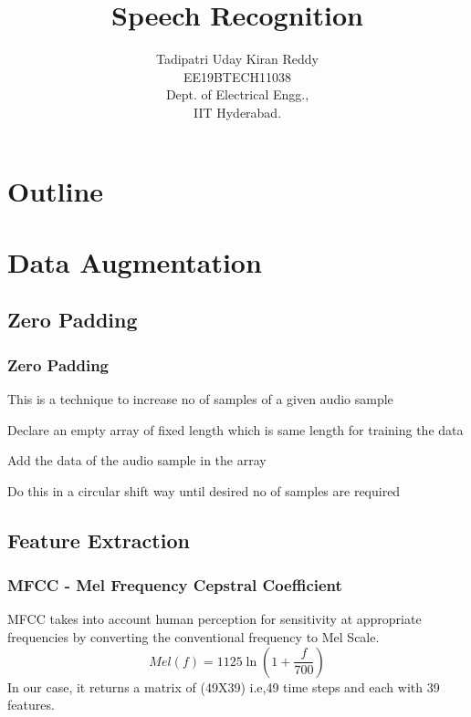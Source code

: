 \documentclass{beamer}
\title{Speech Recognition}
\author{Tadipatri Uday Kiran Reddy\\EE19BTECH11038 \\ Dept. of Electrical Engg.,\\IIT Hyderabad.}
\theoremstyle{remark}
\numberwithin{equation}{section}
\begin{document}
\begin{frame}
\titlepage
\end{frame}

\section*{Outline}
\begin{frame}
\tableofcontents
\end{frame}
\section{Data Augmentation}
\subsection{Zero Padding}
\begin{frame}
\frametitle{Zero Padding}
This is a technique to increase no of samples of a given audio sample
\begin{description}[font=$\bullet$~\normalfont\scshape\color{red!50!black}]
\item [] Declare an empty array of fixed length which is same length for training the data
\item [] Add the data of the audio sample in the array
\item [] Do this in a circular shift way until desired no of samples are required
\end{description}

\end{frame}

\subsection{Feature Extraction}
\begin{frame}
\frametitle{MFCC - Mel Frequency Cepstral Coefficient}
 MFCC takes into account human perception for sensitivity at appropriate frequencies by converting the conventional frequency to Mel Scale.\\
 \begin{equation*}
     Mel(f) = 1125\ln({1 + \frac{f}{700}})
 \end{equation*}
 In our case, it returns a matrix of (49X39) i.e,49 time steps and each with 39 features.
\end{frame}
\end{document}
